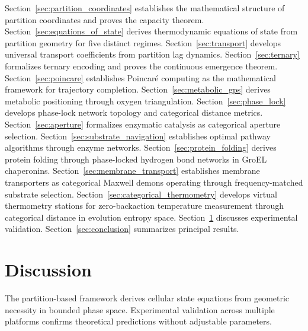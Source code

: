 \documentclass[12pt,a4paper]{article}
\theoremstyle{plain}
\theoremstyle{definition}
\theoremstyle{remark}
\begin{document}
Section~\ref{sec:partition_coordinates} establishes the mathematical structure of partition coordinates and proves the capacity theorem. Section~\ref{sec:equations_of_state} derives thermodynamic equations of state from partition geometry for five distinct regimes. Section~\ref{sec:transport} develops universal transport coefficients from partition lag dynamics. Section~\ref{sec:ternary} formalizes ternary encoding and proves the continuous emergence theorem. Section~\ref{sec:poincare} establishes Poincaré computing as the mathematical framework for trajectory completion. Section~\ref{sec:metabolic_gps} derives metabolic positioning through oxygen triangulation. Section~\ref{sec:phase_lock} develops phase-lock network topology and categorical distance metrics. Section~\ref{sec:aperture} formalizes enzymatic catalysis as categorical aperture selection. Section~\ref{sec:substrate_navigation} establishes optimal pathway algorithms through enzyme networks. Section~\ref{sec:protein_folding} derives protein folding through phase-locked hydrogen bond networks in GroEL chaperonins. Section~\ref{sec:membrane_transport} establishes membrane transporters as categorical Maxwell demons operating through frequency-matched substrate selection. Section~\ref{sec:categorical_thermometry} develops virtual thermometry stations for zero-backaction temperature measurement through categorical distance in evolution entropy space. Section~\ref{sec:discussion} discusses experimental validation. Section~\ref{sec:conclusion} summarizes principal results.














\section{Discussion}
\label{sec:discussion}

The partition-based framework derives cellular state equations from geometric necessity in bounded phase space. Experimental validation across multiple platforms confirms theoretical predictions without adjustable parameters.
\end{document}
